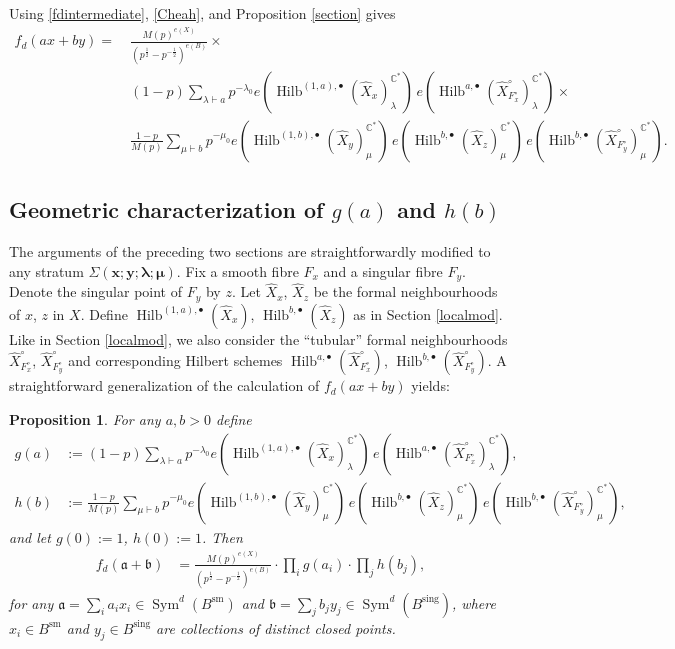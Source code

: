 \documentclass{amsart}
\newtheorem{proposition}[theorem]{Proposition}
\theoremstyle{definition}
\newcommand{\CC} {\mathbb{C}}          %
\newcommand{\Sym}{\operatorname{Sym}}
\newcommand{\Hilb}{\operatorname{Hilb}}
\newcommand{\sm}{\operatorname{sm}}
\newcommand{\sing}{\operatorname{sing}}
\newcommand{\Xhat}{\widehat{X}}
\begin{document}
Using \eqref{fdintermediate}, \eqref{Cheah}, and Proposition \ref{section} gives
\begin{align*}
f_d(ax+by) = \ &\frac{M(p)^{e(X)}}{(p^{\frac{1}{2}}-p^{-\frac{1}{2}})^{e(B)}} \times \\
&(1-p) \sum_{\lambda \vdash a} p^{-\lambda_0} e(\Hilb^{(1,a),\bullet}(\Xhat _x)_{\lambda}^{\CC^*}) \, e(\Hilb^{a,\bullet}(\Xhat ^{\circ}_{F_{x}^{\circ}})_{\lambda}^{\CC^*}) \times \\
&\frac{1-p}{M(p)} \sum_{\mu \vdash b} p^{-\mu_0} e(\Hilb^{(1,b),\bullet}(\Xhat _y)_{\mu}^{\CC^*}) \, e(\Hilb^{b,\bullet}(\Xhat _z)_{\mu}^{\CC^*}) \, e(\Hilb^{b,\bullet}(\Xhat ^{\circ}_{F_{y}^{\circ}})_{\mu}^{\CC^*}).
\end{align*}

   
\subsection{Geometric characterization of $g(a)$ and $h(b)$} \label{chargh}

The arguments of the preceding two sections are straightforwardly modified to any stratum $\Sigma(\boldsymbol{x};\boldsymbol{y};\boldsymbol{\lambda};\boldsymbol{\mu})$. Fix a smooth fibre $F_x$ and a singular fibre $F_y$. Denote the singular point of $F_y$ by $z$. Let $\Xhat _x$, $\Xhat _z$ be the formal neighbourhoods of $x$, $z$ in $X$. Define $\Hilb^{(1,a),\bullet}(\Xhat _x)$, $\Hilb^{b,\bullet}(\Xhat _z)$ as in Section \ref{localmod}. Like in Section \ref{localmod}, we also consider the ``tubular'' formal neighbourhoods $\Xhat ^{\circ}_{F_{x}^{\circ}}$, $\Xhat ^{\circ}_{F_{y}^{\circ}}$ and corresponding Hilbert schemes $\Hilb^{a,\bullet}(\Xhat ^{\circ}_{F_{x}^{\circ}})$, $\Hilb^{b,\bullet}(\Xhat ^{\circ}_{F_{y}^{\circ}})$. A straightforward generalization of the calculation of $f_d(ax+by) $ yields:
\begin{proposition} \label{geomgh}
For any $a,b>0$ define
\begin{align*}
g(a) &:= (1-p) \sum_{\lambda \vdash a} p^{-\lambda_0} e(\Hilb^{(1,a),\bullet}(\Xhat _x)_{\lambda}^{\CC^*}) \, e(\Hilb^{a,\bullet}(\Xhat ^{\circ}_{F_{x}^{\circ}})_{\lambda}^{\CC^*}), \\
h(b) &:= \frac{1-p}{M(p)} \sum_{\mu \vdash b} p^{-\mu_0} e(\Hilb^{(1,b),\bullet}(\Xhat _y)_{\mu}^{\CC^*}) \, e(\Hilb^{b,\bullet}(\Xhat _z)_{\mu}^{\CC^*}) \, e(\Hilb^{b,\bullet}(\Xhat ^{\circ}_{F_{y}^{\circ}})_{\mu}^{\CC^*}),
\end{align*}
and let $g(0) := 1$, $h(0) :=1$. Then
\begin{align*}
f_{d}(\mathfrak{a} + \mathfrak{b}) &= \frac{M(p)^{e(X)}}{(p^{\frac{1}{2}}-p^{-\frac{1}{2}})^{e(B)}} \cdot \prod_{i} g(a_i) \cdot \prod_{j} h(b_j), 
\end{align*}
for any $\mathfrak{a} = \sum_i a_i x_i \in \Sym^{d}(B^{\sm})$ and $\mathfrak{b} = \sum_j b_j y_j \in \Sym^{d}(B^{\sing})$, where $x_i \in B^{\sm}$ and $y_j \in B^{\sing}$ are collections of distinct closed points.
\end{proposition}
   
\end{document}
